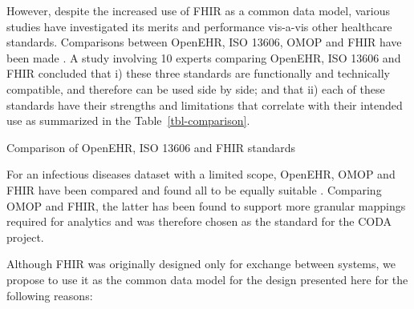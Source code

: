 \documentclass[
  authoryear]{elsarticle}
\begin{document}
However, despite the increased use of FHIR as a common data model,
various studies have investigated its merits and performance vis-a-vis
other healthcare standards. Comparisons between OpenEHR, ISO 13606, OMOP
and FHIR have been made
\citep{ayaz2023transforming, mullie2023coda, rinaldi2021openehr, cremonesi2023need, sinaci2023data}.
A study involving 10 experts comparing OpenEHR, ISO 13606 and FHIR
concluded that i) these three standards are functionally and technically
compatible, and therefore can be used side by side; and that ii) each of
these standards have their strengths and limitations that correlate with
their intended use as summarized in the Table~\ref{tbl-comparison}.

\begin{table}

\caption{\label{tbl-comparison}Comparison of OpenEHR, ISO 13606 and FHIR
standards}


\end{table}%

For an infectious diseases dataset with a limited scope, OpenEHR, OMOP
and FHIR have been compared and found all to be equally suitable
\citep{rinaldi2021openehr}. Comparing OMOP and FHIR, the latter has been
found to support more granular mappings required for analytics and was
therefore chosen as the standard for the CODA
project\citep{mullie2023coda}.

Although FHIR was originally designed only for exchange between systems,
we propose to use it as the common data model for the design presented
here for the following reasons:
\end{document}
